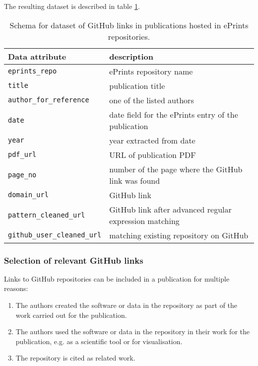 \documentclass[10pt,a4paper]{scrartcl}
\begin{document}
The resulting dataset is described in table \ref{table:github_eprints}.

\begin{table}
    \begin{tabular}{|l|l|}
        \hline
        Data attribute & description \\
        \hline 
        \verb|eprints_repo| & ePrints repository name\\
        \verb|title| & publication title\\
        \verb|author_for_reference| & one of the listed authors\\
        \verb|date| & date field for the ePrints entry of the publication\\
        \verb|year| & year extracted from date\\
        \verb|pdf_url| & URL of publication PDF\\
        \verb|page_no| & number of the page where the GitHub link was found\\
        \verb|domain_url| & GitHub link\\
        \verb|pattern_cleaned_url| & GitHub link after advanced regular expression matching\\
        \verb|github_user_cleaned_url| & matching existing repository on GitHub\\
        \hline
    \end{tabular}
    \caption{Schema for dataset of GitHub links in publications hosted in ePrints repositories.}
    \label{table:github_eprints}
\end{table}

\subsubsection*{Selection of relevant GitHub links}

Links to GitHub repositories can be included in a publication for multiple reasons:
\begin{enumerate}
    \item The authors created the software or data in the repository as part of the work carried out for the publication.
    \item The authors used the software or data in the repository in their work for the publication, e.g. as a scientific tool or for visualisation.
    \item The repository is cited as related work.
\end{enumerate}
\end{document}
